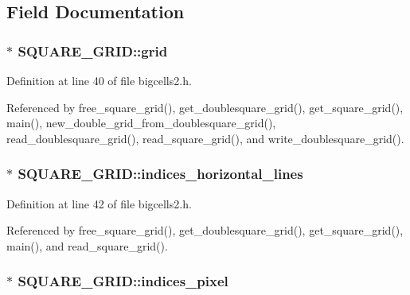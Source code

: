 \subsection{Field Documentation}
\hypertarget{struct_s_q_u_a_r_e___g_r_i_d_a1c644dbcb1491fd18a849d116240e8fa}{
\subsubsection[{grid}]{$\ast$ S\-Q\-U\-A\-R\-E\-\_\-\-G\-R\-I\-D\-::grid}}\label{struct_s_q_u_a_r_e___g_r_i_d_a1c644dbcb1491fd18a849d116240e8fa}


Definition at line 40 of file bigcells2.\-h.



Referenced by free\-\_\-square\-\_\-grid(), get\-\_\-doublesquare\-\_\-grid(), get\-\_\-square\-\_\-grid(), main(), new\-\_\-double\-\_\-grid\-\_\-from\-\_\-doublesquare\-\_\-grid(), read\-\_\-doublesquare\-\_\-grid(), read\-\_\-square\-\_\-grid(), and write\-\_\-doublesquare\-\_\-grid().

\hypertarget{struct_s_q_u_a_r_e___g_r_i_d_a51a0e40364a2454fbaf84d5c12314fde}{
\subsubsection[{indices\-\_\-horizontal\-\_\-lines}]{ $\ast$ S\-Q\-U\-A\-R\-E\-\_\-\-G\-R\-I\-D\-::indices\-\_\-horizontal\-\_\-lines}}\label{struct_s_q_u_a_r_e___g_r_i_d_a51a0e40364a2454fbaf84d5c12314fde}


Definition at line 42 of file bigcells2.\-h.



Referenced by free\-\_\-square\-\_\-grid(), get\-\_\-doublesquare\-\_\-grid(), get\-\_\-square\-\_\-grid(), main(), and read\-\_\-square\-\_\-grid().

\hypertarget{struct_s_q_u_a_r_e___g_r_i_d_a7fa124cc193522d90d3bff5089f6f582}{
\subsubsection[{indices\-\_\-pixel}]{$\ast$ S\-Q\-U\-A\-R\-E\-\_\-\-G\-R\-I\-D\-::indices\-\_\-pixel}}\label{struct_s_q_u_a_r_e___g_r_i_d_a7fa124cc193522d90d3bff5089f6f582}


